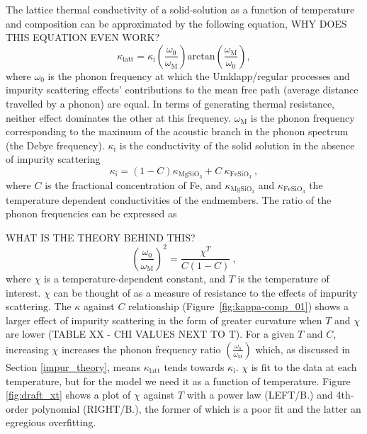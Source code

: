 The lattice thermal conductivity of a solid-solution as a function of temperature and composition can be approximated by the following equation,
%
WHY DOES THIS EQUATION EVEN WORK?
%
\begin{equation}
\kappa_{\mathrm{latt}}=\kappa_{\mathrm{i}}\left ( \frac{\omega_{\mathrm{0}}}{\omega_{\mathrm{M}}} \right )\mathrm{arctan}\left ( \frac{\omega_{\mathrm{M}}}{\omega_{\mathrm{0}}} \right ),
\label{eq.ohta7}
\end{equation}
%
where $\omega_{\mathrm{0}}$ is the phonon frequency at which the Umklapp/regular processes and impurity scattering effects' contributions to the mean free path (average distance travelled by a phonon) are equal. In terms of generating thermal resistance, neither effect dominates the other at this frequency. $\omega_{\mathrm{M}}$ is the phonon frequency corresponding to the maximum of the acoustic branch in the phonon spectrum (the Debye frequency). $\kappa_{\mathrm{i}}$ is the conductivity of the solid solution in the absence of impurity scattering
%
\begin{equation}
\kappa_{\mathrm{i}}=\left ( 1-C \right )\kappa_{\mathrm{MgSiO_{3}}}+C\ \kappa_{\mathrm{FeSiO_{3}}}\ ,
\label{eq.ohta9}
\end{equation}
%
where $C$ is the fractional concentration of Fe, and $\kappa_{\mathrm{MgSiO_{3}}}$ and $\kappa_{\mathrm{FeSiO_{3}}}$ the temperature dependent conductivities of the endmembers. The ratio of the phonon frequencies can be expressed as

WHAT IS THE THEORY BEHIND THIS?
%
\begin{equation}
\left ( \frac{\omega_{\mathrm{0}}}{\omega_{\mathrm{M}}} \right )^{2}=\frac{\chi^{T}}{C\left ( 1-C \right )}\ ,
\label{eq.ohta8}
\end{equation}
%
where $\chi$ is a temperature-dependent constant, and $T$ is the temperature of interest. $\chi$ can be thought of as a measure of resistance to the effects of impurity scattering. The $\kappa$ against $C$ relationship (Figure~\ref{fig:kappa-comp_01}) shows a larger effect of impurity scattering in the form of greater curvature when $T$ and $\chi$ are lower (TABLE XX - CHI VALUES NEXT TO T). For a given $T$ and $C$, increasing $\chi$ increases the phonon frequency ratio $\left ( \frac{\omega_{\mathrm{0}}}{\omega_{\mathrm{M}}}\right )$ which, as discussed in Section \ref{impur_theory}, means $\kappa_{\mathrm{latt}}$ tends towards $\kappa_{\mathrm{i}}$. $\chi$ is fit to the data at each temperature, but for the model we need it as a function of temperature. Figure \ref{fig:draft_xt} shows a plot of $\chi$ against $T$ with a power law (LEFT/B.) and 4th-order polynomial (RIGHT/B.), the former of which is a poor fit and the latter an egregious overfitting. 

